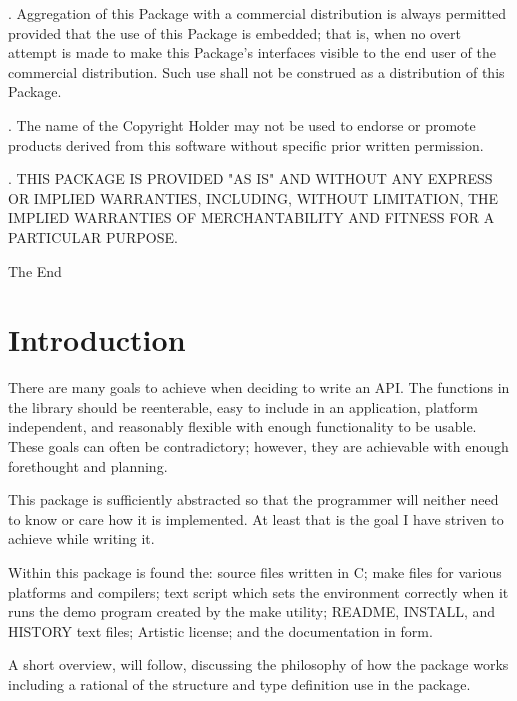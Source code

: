 \documentclass[10pt,letterpaper]{report}
\begin{document}
. Aggregation of this Package with a commercial distribution is always permitted provided that the use of this Package is embedded; that is, when no overt attempt is made to make this Package's interfaces visible to the end user of the commercial distribution.  Such use shall not be construed as a distribution of this Package.
\vspace{8pt}

. The name of the Copyright Holder may not be used to endorse or promote products derived from this software without specific prior written permission.
\vspace{2pt}

. THIS PACKAGE IS PROVIDED "AS IS" AND WITHOUT ANY EXPRESS OR IMPLIED WARRANTIES, INCLUDING, WITHOUT LIMITATION, THE IMPLIED WARRANTIES OF MERCHANTABILITY AND FITNESS FOR A PARTICULAR PURPOSE.

\begin{center}
The End
\end{center}

\chapter*{Introduction}
There are many goals to achieve when deciding to write an API.  The functions in the library should be reenterable, easy to include in an application, platform independent, and reasonably flexible with enough functionality to be usable.  These goals can often be contradictory; however, they are achievable with enough forethought and planning.
\vspace{8pt}

\noindent
This package is sufficiently abstracted so that the programmer will neither need to know or care how it is implemented.  At least that is the goal I have striven to achieve while writing it.
\vspace{8pt}

\noindent
Within this package is found the: source files written in C; make files for various platforms and compilers; text script which sets the environment correctly when it runs the demo program created by the make utility; README, INSTALL, and HISTORY text files; Artistic license; and the documentation in \LaTeXe form.
\vspace{8pt}

\noindent
A short overview, will follow, discussing the philosophy of how the package works including a rational of the structure and type definition use in the package.
\vspace{8pt}
\end{document}
